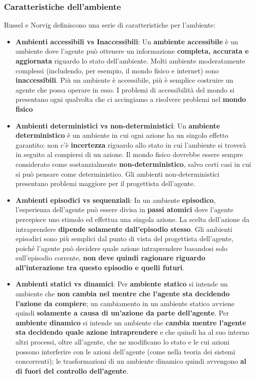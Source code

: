 \documentclass[12pt]{article}
\begin{document}
\subsubsection{Caratteristiche dell'ambiente}
Russel e Norvig definiscono una serie di caratteristiche per l'ambiente:
\begin{itemize}
    \item \textbf{Ambienti accessibili vs Inaccessibili}: Un \textbf{ambiente accessibile} è un ambiente dove l'agente può ottenere un informazione \textbf{completa, accurata e aggiornata} riguardo lo stato dell'ambiente.
    Molti ambiente moderatamente complessi (includendo, per esempio, il mondo fisico e internet) sono \textbf{inaccessibili}. Più un ambiente è accessibile, più è semplice costruire un agente che possa operare in esso.
    I problemi di accessibilità del mondo si presentano ogni qualvolta che ci accingiamo a risolvere problemi nel \textbf{mondo fisico}
    \item \textbf{Ambienti deterministici vs non-deterministici}: Un \textbf{ambiente deterministico} è un ambiente in cui ogni azione ha un singolo effetto garantito: non c'è \textbf{incertezza} riguardo allo stato in cui l'ambiente si troverà in seguito al compiersi di un azione. Il mondo fisico dovrebbe essere sempre considerato come sostanzialmente \textbf{non-deterministico}, salvo certi casi in cui si può pensare come deterministico.
    Gli ambienti non-deterministici presentano problemi maggiore per il progettista dell'agente.
    \item \textbf{Ambienti episodici vs sequenziali}: In un ambiente \textbf{episodico}, l'esperienza dell'agente può essere divisa in \textbf{passi atomici} dove l'agente percepisce uno stimolo ed effettua una singola azione. La scelta dell'azione da intraprendere \textbf{dipende solamente dall'episodio stesso}.
    Gli ambienti episodici sono più semplici dal punto di vista del progettista dell'agente, poiché l'agente può decidere quale azione intraprendere basandosi solo sull'episodio corrente, \textbf{non deve quindi ragionare riguardo all'interazione tra questo episodio e quelli futuri}.
    \item \textbf{Ambienti statici vs dinamici}: Per \textbf{ambiente statico} si intende un ambiente che \textbf{non cambia nel mentre che l'agente sta decidendo l'azione da compiere}; un cambiamento in un ambiente statico avviene quindi \textbf{solamente a causa di un'azione da parte dell'agente}.
    Per \textbf{ambiente dinamico} si intende un ambiente che \textbf{cambia mentre l'agente sta decidendo quale azione intraprendere} e che quindi ha al suo interno altri processi, oltre all'agente, che ne modificano lo stato e le cui azioni possono interferire con le azioni dell'agente (come nella teoria dei sistemi concorrenti); le trasformazioni di un ambiente dinamico quindi avvengono \textbf{al di fuori del controllo dell'agente}.

\end{itemize}
\end{document}
